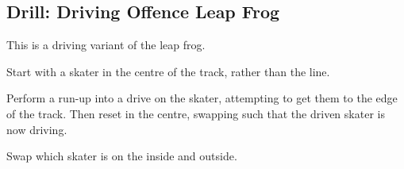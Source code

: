 \subsection*{Drill: Driving Offence Leap Frog}
\label{drill:drives/leap_frog}

This is a driving variant of the leap frog.

Start with a skater in the centre of the track, rather than the line.

Perform a run-up into a drive on the skater, attempting to get them to the edge of the track.
Then reset in the centre, swapping such that the driven skater is now driving. 

Swap which skater is on the inside and outside.

